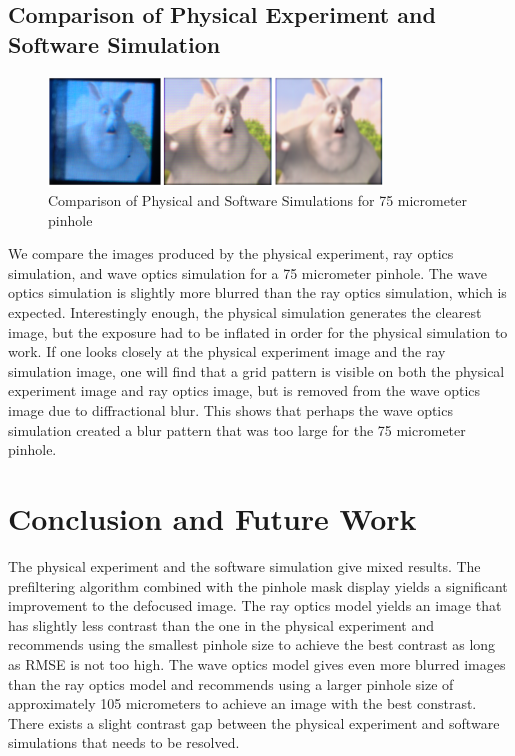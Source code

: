 \documentclass{acmsiggraph}
\begin{document}
\subsection{Comparison of Physical Experiment and Software Simulation}

\begin{figure}[ht]
  \centering
  \includegraphics[width=3.5in]{Comparison.png}
  \caption{Comparison of Physical and Software Simulations for 75 micrometer pinhole}
  \label{fig:ferrari}
\end{figure}

We compare the images produced by the physical experiment, ray optics simulation, and wave optics simulation for a 75 micrometer pinhole. The wave optics simulation is slightly more blurred than the ray optics simulation, which is expected. Interestingly enough, the physical simulation generates the clearest image, but the exposure had to be inflated in order for the physical simulation to work. If one looks closely at the physical experiment image and the ray simulation image, one will find that a grid pattern is visible on both the physical experiment image and ray optics image, but is removed from the wave optics image due to diffractional blur. This shows that perhaps the wave optics simulation created a blur pattern that was too large for the 75 micrometer pinhole. 

\section{Conclusion and Future Work}

The physical experiment and the software simulation give mixed results. The prefiltering algorithm combined with the pinhole mask display yields a significant improvement to the defocused image. The ray optics model yields an image that has slightly less contrast than the one in the physical experiment and recommends using the smallest pinhole size to achieve the best contrast as long as RMSE is not too high. The wave optics model gives even more blurred images than the ray optics model and recommends using a larger pinhole size of approximately 105 micrometers to achieve an image with the best constrast. There exists a slight contrast gap between the physical experiment and software simulations that needs to be resolved.
\end{document}
